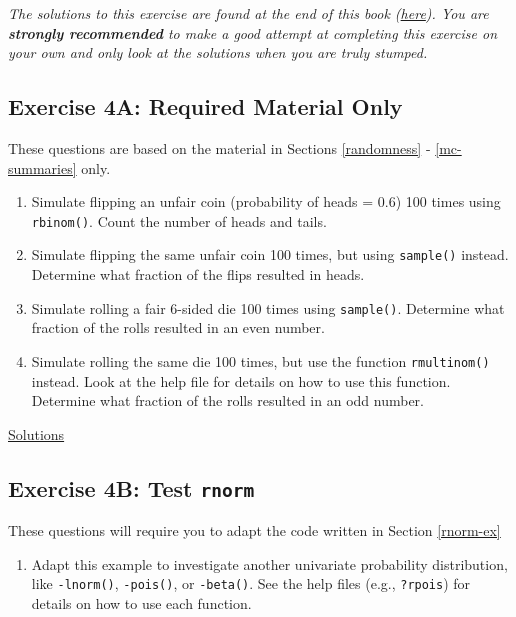 \documentclass[]{book}
\providecommand{\tightlist}{%
  \setlength{\itemsep}{0pt}\setlength{\parskip}{0pt}}
\theoremstyle{definition}
\theoremstyle{definition}
\theoremstyle{definition}
\theoremstyle{remark}
\begin{document}
\emph{The solutions to this exercise are found at the end of this book
(\protect\hyperlink{ex4a-answers}{here}). You are \textbf{strongly
recommended} to make a good attempt at completing this exercise on your
own and only look at the solutions when you are truly stumped.}

\subsection*{Exercise 4A: Required Material
Only}\label{exercise-4a-required-material-only}

These questions are based on the material in Sections \ref{randomness} -
\ref{mc-summaries} only.

\begin{enumerate}
\def\labelenumi{\arabic{enumi}.}
\tightlist
\item
  Simulate flipping an unfair coin (probability of heads = 0.6) 100
  times using \texttt{rbinom()}. Count the number of heads and tails.
\item
  Simulate flipping the same unfair coin 100 times, but using
  \texttt{sample()} instead. Determine what fraction of the flips
  resulted in heads.
\item
  Simulate rolling a fair 6-sided die 100 times using \texttt{sample()}.
  Determine what fraction of the rolls resulted in an even number.
\item
  Simulate rolling the same die 100 times, but use the function
  \texttt{rmultinom()} instead. Look at the help file for details on how
  to use this function. Determine what fraction of the rolls resulted in
  an odd number.
\end{enumerate}

\protect\hyperlink{ex4a-answers}{Solutions}

\subsection*{\texorpdfstring{Exercise 4B: Test
\texttt{rnorm}}{Exercise 4B: Test rnorm}}\label{exercise-4b-test-rnorm}

These questions will require you to adapt the code written in Section
\ref{rnorm-ex}

\begin{enumerate}
\def\labelenumi{\arabic{enumi}.}
\tightlist
\item
  Adapt this example to investigate another univariate probability
  distribution, like \texttt{-lnorm()}, \texttt{-pois()}, or
  \texttt{-beta()}. See the help files (e.g., \texttt{?rpois}) for
  details on how to use each function.
\end{enumerate}
\end{document}
